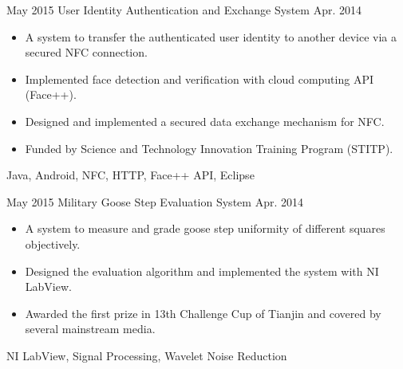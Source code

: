 \begin{projects}
\project
  {May 2015}		{User Identity Authentication and Exchange System}
  {Apr. 2014}		{\begin{itemize}
  						\item A system to transfer the authenticated user identity to another device via a secured NFC connection.
						\item Implemented face detection and verification with cloud computing API (Face++).
                        \item Designed and implemented a secured data exchange mechanism for NFC.
  						\item Funded by Science and Technology Innovation Training Program (STITP). 
  					\end{itemize} 
                    }
                    {Java, Android, NFC, HTTP, Face++ API, Eclipse}
\emptySeparator

\project
  {May 2015}		{Military Goose Step Evaluation System}
  {Apr. 2014}		{\begin{itemize}
  						\item A system to measure and grade goose step uniformity of different squares objectively. 
						\item Designed the evaluation algorithm and implemented the system with NI LabView.
                        \item Awarded the first prize in 13th Challenge Cup of Tianjin and covered by several mainstream media.
  					\end{itemize} 
                    }
                    {NI LabView, Signal Processing, Wavelet Noise Reduction}


\end{projects}

